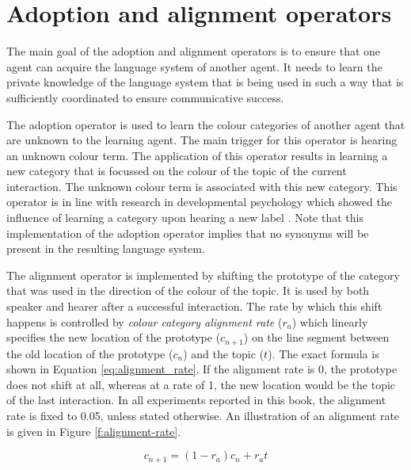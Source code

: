 \section{Adoption and alignment operators}
\label{s:bcs-adoption-alignment-operators}

The main goal of the adoption and alignment operators is to ensure
that one agent can acquire the language system of another agent. It
needs to learn the private knowledge of the language system that is
being used in such a way that is sufficiently coordinated to ensure
communicative success.

The adoption operator
is used to learn the colour categories of
another agent that are unknown to the learning agent. The main trigger
for this operator is hearing an unknown colour term. The application
of this operator results in learning a new category that is focussed
on the colour of the topic of the current interaction. The unknown
colour term is associated with this new category. This operator is in
line with research in developmental psychology which showed the
influence of learning a category upon hearing a new label
\citep{xu02role}. Note that this implementation of the adoption
operator implies that no synonyms will be present in the resulting
language system.

The alignment operator is implemented by shifting the prototype of
the category that was used in the direction of the colour of the
topic. It is used by both speaker and hearer after a successful
interaction. The rate by which this shift happens is controlled by
\emph{colour category alignment rate} 
($r_a$) which linearly specifies the new
location of the prototype ($c_{n+1}$) on the line segment between the
old location of the prototype ($c_n$) and the topic ($t$). The exact
formula is shown in Equation \ref{eq:alignment_rate}. If the alignment
rate is 0, the prototype does not shift at all, whereas at a rate of
1, the new location would be the topic of the last interaction. In all
experiments reported in this book, the alignment rate is fixed to
0.05, unless stated otherwise. An illustration of an alignment rate is
given in Figure \ref{f:alignment-rate}.

\begin{equation}
c_{n+1} = (1 - r_a) c_n  + r_a t
\label{eq:alignment_rate}
\end{equation}

